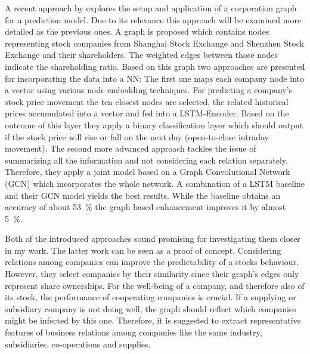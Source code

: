 A recent approach by \citet{Chen2018IncorporatingPrediction} explores the setup and application of a corporation graph for a prediction model. Due to its relevance this approach will be examined more detailed as the previous ones. A graph is proposed which contains nodes representing stock companies from Shanghai Stock Exchange and Shenzhen Stock Exchange and their shareholders. The weighted edges between those nodes indicate the shareholding ratio. Based on this graph two approaches are presented for incorporating the data into a NN: The first one maps each company node into a vector using various node embedding techniques. For predicting a company's stock price movement the ten closest nodes are selected, the related historical prices accumulated into a vector and fed into a LSTM-Encoder. Based on the outcome of this layer they apply a binary classification layer which should output if the stock price will rise or fall on the next day (open-to-close intraday movement). The second more advanced approach tackles the issue of summarizing all the information and not considering each relation separately. Therefore, they apply a joint model based on a Graph Convolutional Network (GCN) which incorporates the whole network. A combination of a LSTM baseline and their GCN model yields the best results. While the baseline obtains an accuracy of about 53~\% the graph based enhancement improves it by almost 5~\%. 

Both of the introduced approaches sound promising for investigating them closer in my work.
The latter work can be seen as a proof of concept. Considering relations among companies can improve the predictability of a stocks behaviour. However, they select companies by their similarity since their graph's edges only represent share ownerships. For the well-being of a company, and therefore also of its stock, the performance of cooperating companies is crucial. If a supplying or subsidiary company is not doing well, the graph should reflect which companies might be infected by this one. Therefore, it is suggested to extract representative features of business relations among companies like the same industry, subsidiaries, co-operations and supplies.

% 




